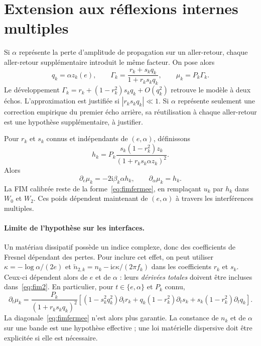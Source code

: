 \documentclass[11pt,a4paper]{article}
\newcommand{\ii}{\mathrm{i}}
\begin{document}
\section{Extension aux réflexions internes multiples}\label{sec:multiple}

Si $\alpha$ représente la perte d'amplitude de propagation sur un
aller-retour, chaque aller-retour supplémentaire introduit le même facteur.
On pose alors
\begin{equation}
 q_k=\alpha z_k(e),\qquad
 \Gamma_k=\frac{r_k+s_kq_k}{1+r_ks_kq_k},\qquad
 \mu_k=P_k\Gamma_k.
\end{equation}
Le développement
$\Gamma_k=r_k+(1-r_k^2)s_kq_k+O(q_k^2)$ retrouve le modèle à deux échos.
L'approximation est justifiée si $|r_ks_kq_k|\ll1$.
Si $\alpha$ représente seulement une correction empirique du premier
écho arrière, sa réutilisation à chaque aller-retour est une hypothèse
supplémentaire, à justifier.

Pour $r_k$ et $s_k$ connus et indépendants de $(e,\alpha)$, définissons
\begin{equation}
 h_k=P_k\frac{s_k(1-r_k^2)z_k}{(1+r_ks_k\alpha z_k)^2}.
\end{equation}
Alors
\begin{equation}
 \partial_e\mu_k=-2\ii\beta_k\alpha h_k,\qquad
 \partial_\alpha\mu_k=h_k.
\end{equation}
La FIM calibrée reste de la forme~\eqref{eq:fimfermee}, en remplaçant
$u_k$ par $h_k$ dans $W_0$ et $W_2$. Ces poids dépendent maintenant de
$(e,\alpha)$ à travers les interférences multiples.

\paragraph{Limite de l'hypothèse sur les interfaces.}
Un matériau dissipatif possède un indice complexe, donc des coefficients
de Fresnel dépendant des pertes. Pour inclure cet effet, on peut utiliser
$\kappa=-\log\alpha/(2e)$ et
$\widetilde n_{2,k}=n_k-\ii c\kappa/(2\pi f_k)$ dans les coefficients
$r_k$ et $s_k$. Ceux-ci dépendent alors de $e$ et de $\alpha$ : leurs
\emph{dérivées totales} doivent être incluses dans~\eqref{eq:fim2}.
En particulier, pour $t\in\{e,\alpha\}$ et $P_k$ connu,
\begin{equation}
 \partial_t\mu_k=\frac{P_k}{(1+r_ks_kq_k)^2}
 \left[(1-s_k^2q_k^2)\partial_t r_k
 +q_k(1-r_k^2)\partial_t s_k
 +s_k(1-r_k^2)\partial_t q_k\right].
\end{equation}
La diagonale~\eqref{eq:fimfermee} n'est alors plus garantie. La constance de
$n_k$ et de $\alpha$ sur une bande est une hypothèse effective ; une loi
matérielle dispersive doit être explicitée si elle est nécessaire.
\end{document}
